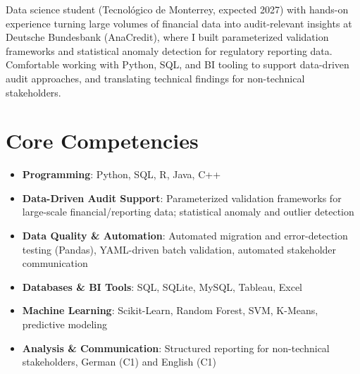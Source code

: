 \documentclass[11pt,a4paper,sans]{moderncv}
\begin{document}
\makecvtitle


\vspace{6pt}
\small{Data science student (Tecnológico de Monterrey, expected 2027) with hands-on experience turning large volumes of financial data into audit-relevant insights at Deutsche Bundesbank (AnaCredit), where I built parameterized validation frameworks and statistical anomaly detection for regulatory reporting data. Comfortable working with Python, SQL, and BI tooling to support data-driven audit approaches, and translating technical findings for non-technical stakeholders.}


\section{Core Competencies}
\vspace{1pt}
\begin{itemize}

\item \textbf{Programming}: Python, SQL, R, Java, C++

\item \textbf{Data-Driven Audit Support}: Parameterized validation frameworks for large-scale financial/reporting data; statistical anomaly and outlier detection

\item \textbf{Data Quality \& Automation}: Automated migration and error-detection testing (Pandas), YAML-driven batch validation, automated stakeholder communication

\item \textbf{Databases \& BI Tools}: SQL, SQLite, MySQL, Tableau, Excel

\item \textbf{Machine Learning}: Scikit-Learn, Random Forest, SVM, K-Means, predictive modeling

\item \textbf{Analysis \& Communication}: Structured reporting for non-technical stakeholders, German (C1) and English (C1)

\end{itemize}
\end{document}
